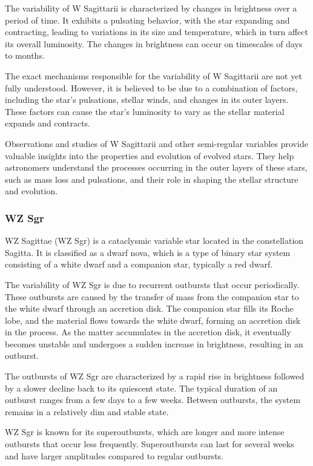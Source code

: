 The variability of W Sagittarii is characterized by changes in brightness over a period of time. It exhibits a pulsating behavior, with the star expanding and contracting, leading to variations in its size and temperature, which in turn affect its overall luminosity. The changes in brightness can occur on timescales of days to months.

The exact mechanisms responsible for the variability of W Sagittarii are not yet fully understood. However, it is believed to be due to a combination of factors, including the star's pulsations, stellar winds, and changes in its outer layers. These factors can cause the star's luminosity to vary as the stellar material expands and contracts.

Observations and studies of W Sagittarii and other semi-regular variables provide valuable insights into the properties and evolution of evolved stars. They help astronomers understand the processes occurring in the outer layers of these stars, such as mass loss and pulsations, and their role in shaping the stellar structure and evolution.


\subsubsection*{ WZ Sgr }

WZ Sagittae (WZ Sgr) is a cataclysmic variable star located in the constellation Sagitta. It is classified as a dwarf nova, which is a type of binary star system consisting of a white dwarf and a companion star, typically a red dwarf.

The variability of WZ Sgr is due to recurrent outbursts that occur periodically. These outbursts are caused by the transfer of mass from the companion star to the white dwarf through an accretion disk. The companion star fills its Roche lobe, and the material flows towards the white dwarf, forming an accretion disk in the process. As the matter accumulates in the accretion disk, it eventually becomes unstable and undergoes a sudden increase in brightness, resulting in an outburst.

The outbursts of WZ Sgr are characterized by a rapid rise in brightness followed by a slower decline back to its quiescent state. The typical duration of an outburst ranges from a few days to a few weeks. Between outbursts, the system remains in a relatively dim and stable state.

WZ Sgr is known for its superoutbursts, which are longer and more intense outbursts that occur less frequently. Superoutbursts can last for several weeks and have larger amplitudes compared to regular outbursts.

